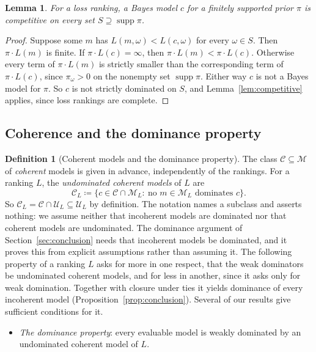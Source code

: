 \documentclass[11pt]{article}
\newtheorem{lemma}[theorem]{Lemma}
\theoremstyle{definition}
\newtheorem{definition}[theorem]{Definition}
\theoremstyle{remark}
\newcommand{\M}{\mathcal M}
\newcommand{\C}{\mathcal C}
\newcommand{\U}{\mathcal U}
\newcommand{\supp}{\operatorname{supp}}
\begin{document}
\begin{lemma}\label{lem:bayes-competitive}
For a loss ranking, a Bayes model $c$ for a finitely supported prior $\pi$ is competitive on every set $S\supseteq\supp\pi$.
\end{lemma}
\begin{proof}
Suppose some $m$ has $L(m,\omega)<L(c,\omega)$ for every $\omega\in S$. Then $\pi\cdot L(m)$ is finite. If $\pi\cdot L(c)=\infty$, then $\pi\cdot L(m)<\pi\cdot L(c)$. Otherwise every term of $\pi\cdot L(m)$ is strictly smaller than the corresponding term of $\pi\cdot L(c)$, since $\pi_\omega>0$ on the nonempty set $\supp\pi$. Either way $c$ is not a Bayes model for $\pi$. So $c$ is not strictly dominated on $S$, and Lemma~\ref{lem:competitive} applies, since loss rankings are complete.
\end{proof}

\subsection{Coherence and the dominance property}
\begin{definition}[Coherent models and the dominance property]\label{def:coherence-property}
The class $\C\subseteq\M$ of \emph{coherent} models is given in advance, independently of the rankings. For a ranking $L$, the \emph{undominated coherent models} of $L$ are
\[
\C_L\coloneqq\{c\in\C\cap\M_L:\ \text{no } m\in\M_L \text{ dominates } c\}.
\]
So $\C_L=\C\cap\U_L\subseteq\U_L$ by definition. The notation names a subclass and asserts nothing: we assume neither that incoherent models are dominated nor that coherent models are undominated. The dominance argument of Section~\ref{sec:conclusion} needs that incoherent models be dominated, and it proves this from explicit assumptions rather than assuming it. The following property of a ranking $L$ asks for more in one respect, that the weak dominators be undominated coherent models, and for less in another, since it asks only for weak domination. Together with closure under ties it yields dominance of every incoherent model (Proposition~\ref{prop:conclusion}). Several of our results give sufficient conditions for it.
\begin{itemize}[leftmargin=*]
\item \emph{The dominance property}: every evaluable model is weakly dominated by an undominated coherent model of $L$.
\end{itemize}
\end{definition}
\end{document}
